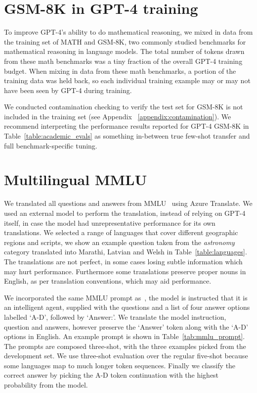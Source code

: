 \documentclass{article}
\begin{document}
\section{GSM-8K in GPT-4 training}
\label{appendix:gsm}

To improve GPT-4's ability to do mathematical reasoning, we mixed in data from the training set of MATH and GSM-8K, two commonly studied benchmarks for mathematical reasoning in language models. The total number of tokens drawn from these math benchmarks was a tiny fraction of the overall GPT-4 training budget. When mixing in data from these math benchmarks, a portion of the training data was held back, so each individual training example may or may not have been seen by GPT-4 during training.

We conducted contamination checking to verify the test set for GSM-8K is not included in the training set (see Appendix ~\ref{appendix:contamination}). We recommend interpreting the performance results reported for GPT-4 GSM-8K in Table~\ref{table:academic_evals} as something in-between true few-shot transfer and full benchmark-specific tuning. 

\section{Multilingual MMLU}
We translated all questions and answers from MMLU~\citep{hendrycks20mmlu} using Azure Translate. We used an external model to perform the translation, instead of relying on GPT-4 itself, in case the model had unrepresentative performance for its own translations. We selected a range of languages that cover different geographic regions and scripts, we show an example question taken from the \textit{astronomy} category translated into Marathi, Latvian and Welsh in Table~\ref{table:languages}. The translations are not perfect, in some cases losing subtle information which may hurt performance. Furthermore some translations preserve proper nouns in English, as per translation conventions, which may aid performance. 

We incorporated the same MMLU prompt as~\citep{rae2021scaling}, the model is instructed that it is an intelligent agent, supplied with the questions and a list of four answer options labelled `A-D', followed by `Answer:'. We translate the model instruction, question and answers, however preserve the `Answer' token along with the `A-D' options in English. An example prompt is shown in Table~\ref{tab:mmlu_prompt}. The prompts are composed three-shot, with the three examples picked from the development set. We use three-shot evaluation over the regular five-shot because some languages map to much longer token sequences. Finally we classify the correct answer by picking the A-D token continuation with the highest probability from the model.
\label{appendix:mmludetails}
\end{document}
